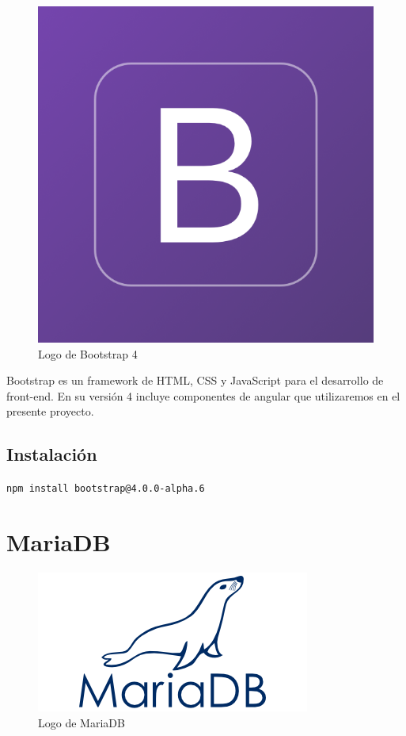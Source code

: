 \documentclass[openright,twoside,10pt]{book}
\begin{document}
    \begin{figure}[H]
        \begin{center}
            \includegraphics[scale=0.15]{img/bootstrap4.png}
        \end{center}
        \caption{Logo de Bootstrap 4}
    \end{figure}
    
    Bootstrap es un framework de HTML, CSS y JavaScript para el desarrollo
    de front-end. En su versión 4 incluye componentes de angular que
    utilizaremos en el presente proyecto.
    
    \subsection{Instalación}\label{instalaciuxf3n-3}
    
    \texttt{npm\ install\ bootstrap@4.0.0-alpha.6}
    
    \section{MariaDB}\label{mariadb}
    
    \begin{figure}[H]
        \begin{center}
            \includegraphics[scale=0.75]{img/mariadb.png}
        \end{center}
        \caption{Logo de MariaDB}
    \end{figure}
    
\end{document}
